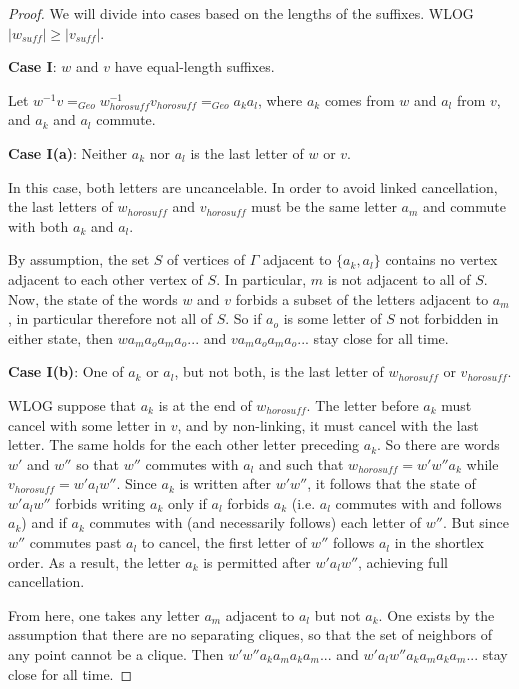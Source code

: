 \documentclass{amsart}
\theoremstyle{definition}
\theoremstyle{remark}
\begin{document}
	\begin{proof}
		
		We will divide into cases based on the lengths of the suffixes. \newline WLOG $|w_{suff}|\ge |v_{suff}|$.
		
		\textbf{Case I}: $w$ and $v$ have equal-length suffixes.
		
		Let $w^{-1}v=_{Geo}w_{horosuff}^{-1}v_{horosuff}=_{Geo}a_ka_l$, where $a_k$ comes from $w$ and $a_l$ from $v$, and $a_k$ and $a_l$ commute.
		
		\textbf{Case I(a)}: Neither $a_k$ nor $a_l$ is the last letter of $w$ or $v$.
		
		In this case, both letters are uncancelable. In order to avoid linked cancellation, the last letters of $w_{horosuff}$ and $v_{horosuff}$ must be the same letter $a_m$ and commute with both $a_k$ and $a_l$.
		
		By assumption, the set $S$ of vertices of $\Gamma$ adjacent to $\{a_k, a_l\}$ contains no vertex adjacent to each other vertex of $S$. In particular, $m$ is not adjacent to all of $S$. Now, the state of the words $w$ and $v$ forbids a subset of the letters adjacent to $a_m$, in particular therefore not all of $S$. So if $a_o$ is some letter of $S$ not forbidden in either state, then $wa_ma_oa_ma_o...$ and $va_ma_oa_ma_o...$ stay close for all time.
		
		\textbf{Case I(b)}: One of $a_k$ or $a_l$, but not both, is the last letter of $w_{horosuff}$ or $v_{horosuff}$.
		
		WLOG suppose that $a_k$ is at the end of $w_{horosuff}$. The letter before $a_k$ must cancel with some letter in $v$, and by non-linking, it must cancel with the last letter. The same holds for the each other letter preceding $a_k$. So there are words $w'$ and $w''$ so that $w''$ commutes with $a_l$ and such that $w_{horosuff} = w'w''a_k$ while $v_{horosuff}=w'a_lw''$. Since $a_k$ is written after $w'w''$, it follows that the state of $w'a_lw''$ forbids writing $a_k$ only if $a_l$ forbids $a_k$ (i.e. $a_l$ commutes with and follows $a_k$) and if $a_k$ commutes with (and necessarily follows) each letter of $w''$. But since $w''$ commutes past $a_l$ to cancel, the first letter of $w''$ follows $a_l$ in the shortlex order. As a result, the letter $a_k$ is permitted after $w'a_lw''$, achieving full cancellation.
		
		From here, one takes any letter $a_m$ adjacent to $a_l$ but not $a_k$. One exists by the assumption that there are no separating cliques, so that the set of neighbors of any point cannot be a clique. Then $w'w''a_ka_ma_ka_m...$ and $w'a_lw''a_ka_ma_ka_m...$ stay close for all time.
		

\end{proof}
\end{document}
